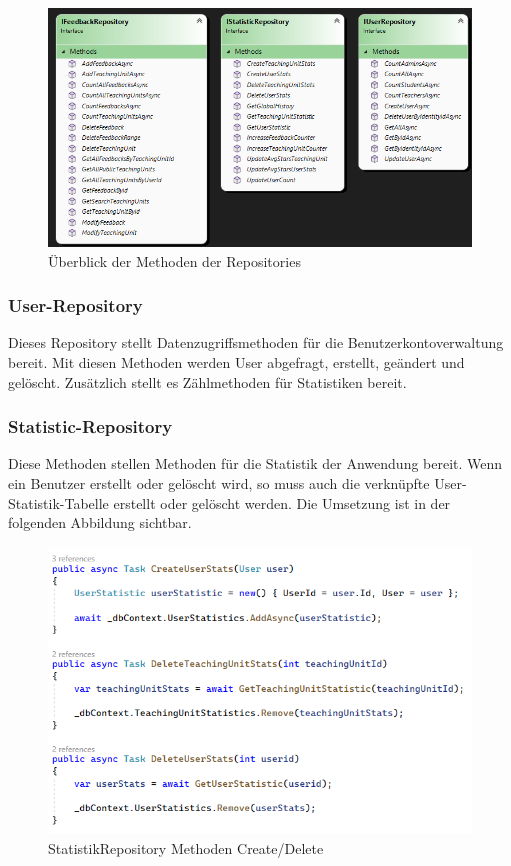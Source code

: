 \begin{figure}[h]
    \begin{center}
        \includegraphics[width=15cm]{./pics/overview-repo-interfaces.png}
    \caption[overview Repos]{Überblick der Methoden der Repositories}
    \end{center}
\end{figure}

\subsubsection{User-Repository}
\author{Stefano Pyringer}
Dieses Repository stellt Datenzugriffsmethoden für die Benutzerkontoverwaltung bereit. Mit diesen Methoden 
werden User abgefragt, erstellt, geändert und gelöscht. Zusätzlich stellt es Zählmethoden für Statistiken bereit.

\subsubsection{Statistic-Repository}
\author{Stefano Pyringer}
Diese Methoden stellen Methoden für die Statistik der Anwendung bereit. Wenn ein Benutzer erstellt oder gelöscht wird, 
so muss auch die verknüpfte User-Statistik-Tabelle erstellt oder gelöscht werden. Die Umsetzung ist in der folgenden Abbildung sichtbar.

\begin{figure}[h]
    \begin{center}
        \includegraphics[width=15cm]{./pics/Persistance/UserStats.png}
    \caption[Userstats]{StatistikRepository Methoden Create/Delete}
    \end{center}
\end{figure}

